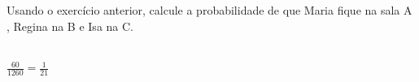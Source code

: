 \begin{ex}
 	Usando o exercício anterior, calcule a probabilidade de que Maria fique na sala A , Regina na B e Isa na C.
 	  \begin{sol}
 	    \phantom{A} \\
 	    $\frac{60}{1260}=\frac{1}{21}$
 	  \end{sol}
\end{ex}